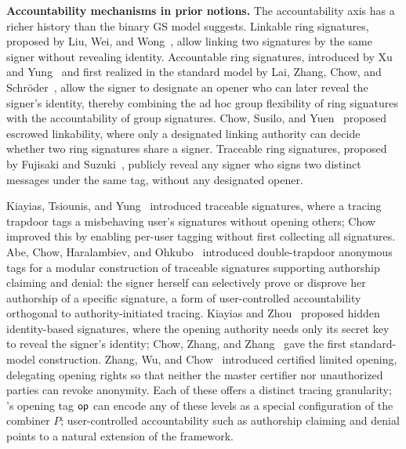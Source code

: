 \medskip
\noindent\textbf{Accountability mechanisms in prior notions.}
The accountability axis has a richer history than the binary GS model suggests.
Linkable ring signatures, proposed by Liu, Wei, and Wong~\cite{ACISP:LiuWeiWong04}, allow linking two signatures
by the same signer without revealing identity.
Accountable ring signatures, introduced by Xu and Yung~\cite{CARDIS:XuYun04}
and first realized in the standard model by
Lai, Zhang, Chow, and Schr\"{o}der~\cite{ESORICS:LaZhChowSch16},
allow the signer to designate an opener who can later reveal the signer's identity,
thereby combining the ad hoc group flexibility of ring signatures
with the accountability of group signatures.
Chow, Susilo, and Yuen~\cite{VIETCRYPT:ChowSusYue06} proposed
escrowed linkability, where only a designated linking authority
can decide whether two ring signatures share a signer.
Traceable ring signatures, proposed by Fujisaki and Suzuki~\cite{PKC:FujSuz07}, 
publicly reveal any signer who signs two distinct messages under the same tag, without any designated opener.

Kiayias, Tsiounis, and Yung~\cite{EC:KiayiasYung04} introduced traceable signatures,
where a tracing trapdoor tags a misbehaving user's signatures without opening others;
Chow~\cite{SAC:Chow09} improved this by enabling per-user tagging
without first collecting all signatures.
Abe, Chow, Haralambiev, and Ohkubo~\cite{IJIS:AbeChowHarOhk13}
introduced double-trapdoor anonymous tags for a modular construction of traceable signatures
supporting authorship claiming and denial:
the signer herself can selectively prove or disprove her authorship of a specific signature,
a form of user-controlled accountability orthogonal to authority-initiated tracing.
Kiayias and Zhou~\cite{FC:KiayiasZhou07} proposed hidden identity-based signatures,
where the opening authority needs only its secret key to reveal the signer's identity;
Chow, Zhang, and Zhang~\cite{FC:ChowZhaZha17} gave the first standard-model construction.
Zhang, Wu, and Chow~\cite{RSA:ZhaWuChow19} introduced certified limited opening,
delegating opening rights so that neither the master certifier
nor unauthorized parties can revoke anonymity.
Each of these offers a distinct tracing granularity;
\SMS's opening tag $\mathsf{op}$ can encode any of these levels
as a special configuration of the combiner $P$;
user-controlled accountability such as authorship claiming and denial
points to a natural extension of the framework.


